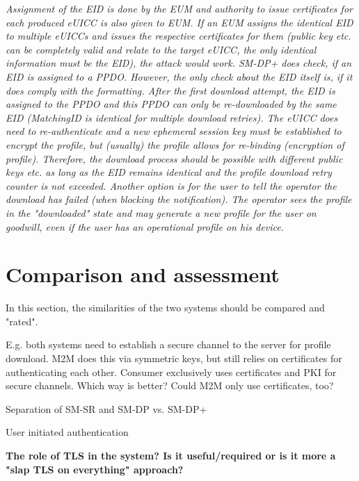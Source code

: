 \textit{Assignment of the EID is done by the EUM and authority to issue certificates for each produced eUICC is also given to EUM. If an EUM assigns the identical EID to multiple eUICCs and issues the respective certificates for them (public key etc. can be completely valid and relate to the target eUICC, the only identical information must be the EID), the attack would work. SM-DP+ does check, if an EID is assigned to a PPDO. However, the only check about the EID itself is, if it does comply with the formatting. After the first download attempt, the EID is assigned to the PPDO and this PPDO can only be re-downloaded by the same EID (MatchingID is identical for multiple download retries). The eUICC does need to re-authenticate and a new ephemeral session key must be established to encrypt the profile, but (usually) the profile allows for re-binding (encryption of profile). Therefore, the download process should be possible with different public keys etc. as long as the EID remains identical and the profile download retry counter is not exceeded.
Another option is for the user to tell the operator the download has failed (when blocking the notification). The operator sees the profile in the "downloaded" state and may generate a new profile for the user on goodwill, even if the user has an operational profile on his device.}


\section{Comparison and assessment}
In this section, the similarities of the two systems should be compared and "rated".

E.g. both systems need to establish a secure channel to the server for profile download. M2M does this via symmetric keys, but still relies on certificates for authenticating each other. Consumer exclusively uses certificates and PKI for secure channels. Which way is better? Could M2M only use certificates, too?

Separation of SM-SR and SM-DP vs. SM-DP+

User initiated authentication

\textbf{The role of TLS in the system? Is it useful/required or is it more a "slap TLS on everything" approach?}
